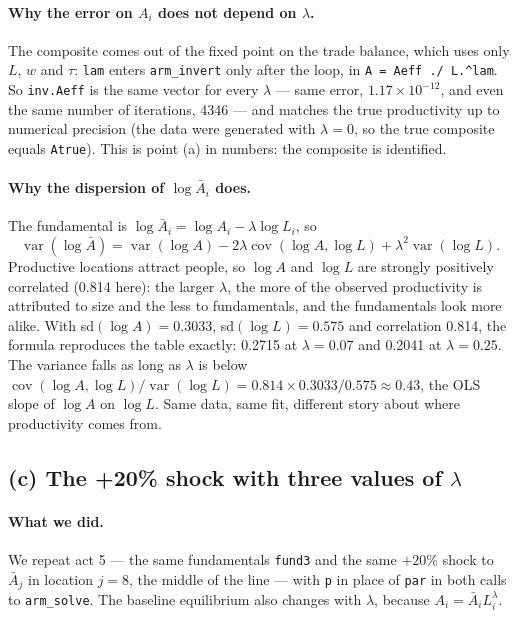 \documentclass[11pt,a4paper]{article}
\begin{document}
\paragraph{Why the error on $A_i$ does not depend on $\lambda$.} The composite comes out of the fixed point on the trade balance, which uses only $L$, $w$ and $\tau$: \texttt{lam} enters \texttt{arm\_invert} only after the loop, in \texttt{A = Aeff ./ L.\^{}lam}. So \texttt{inv.Aeff} is the same vector for every $\lambda$ --- same error, $1.17\times10^{-12}$, and even the same number of iterations, 4346 --- and matches the true productivity up to numerical precision (the data were generated with $\lambda=0$, so the true composite equals \texttt{Atrue}). This is point (a) in numbers: the composite is identified.

\paragraph{Why the dispersion of $\log\bar A_i$ does.} The fundamental is $\log\bar A_i=\log A_i-\lambda\log L_i$, so
\begin{equation}
\operatorname{var}(\log\bar A)=\operatorname{var}(\log A)-2\lambda\operatorname{cov}(\log A,\log L)+\lambda^2\operatorname{var}(\log L).
\end{equation}
Productive locations attract people, so $\log A$ and $\log L$ are strongly positively correlated (0.814 here): the larger $\lambda$, the more of the observed productivity is attributed to size and the less to fundamentals, and the fundamentals look more alike. With sd$(\log A)=0.3033$, sd$(\log L)=0.575$ and correlation 0.814, the formula reproduces the table exactly: 0.2715 at $\lambda=0.07$ and 0.2041 at $\lambda=0.25$. The variance falls as long as $\lambda$ is below $\operatorname{cov}(\log A,\log L)/\operatorname{var}(\log L)=0.814\times0.3033/0.575\approx0.43$, the OLS slope of $\log A$ on $\log L$. Same data, same fit, different story about where productivity comes from.

\subsection*{(c) The +20\% shock with three values of $\lambda$}

\paragraph{What we did.} We repeat act 5 --- the same fundamentals \texttt{fund3} and the same $+20\%$ shock to $\bar A_j$ in location $j=8$, the middle of the line --- with \texttt{p} in place of \texttt{par} in both calls to \texttt{arm\_solve}. The baseline equilibrium also changes with $\lambda$, because $A_i=\bar A_iL_i^{\lambda}$.
\end{document}
